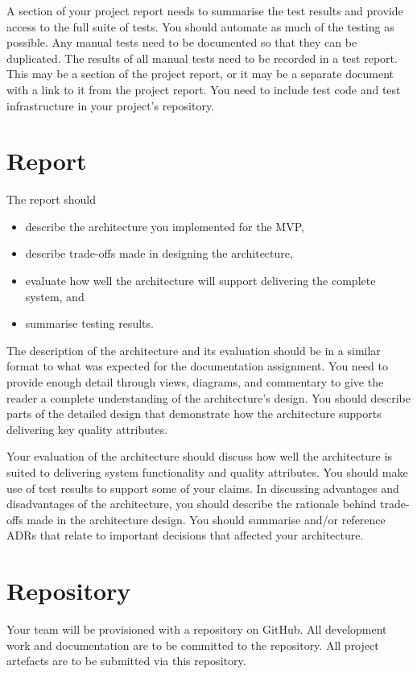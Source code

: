 \documentclass{csse4400}
\begin{document}
A section of your project report needs to summarise the test results and provide access to the full suite of tests.
You should automate as much of the testing as possible.
Any manual tests need to be documented so that they can be duplicated.
The results of all manual tests need to be recorded in a test report.
This may be a section of the project report, or it may be a separate document with a link to it from the project report.
You need to include test code and test infrastructure in your project's repository.


\section{Report}
The report should
\begin{itemize}
    \item describe the architecture you implemented for the MVP,
    \item describe trade-offs made in designing the architecture,
    \item evaluate how well the architecture will support delivering the complete system, and
    \item summarise testing results.
\end{itemize}

The description of the architecture and its evaluation should be in a similar format to what was expected for the documentation assignment.
You need to provide enough detail through views, diagrams, and commentary to give the reader a complete understanding of the architecture's design.
You should describe parts of the detailed design that demonstrate how the architecture supports delivering key quality attributes.

Your evaluation of the architecture should discuss how well the architecture is suited to delivering system functionality and quality attributes.
You should make use of test results to support some of your claims.
In discussing advantages and disadvantages of the architecture, you should describe the rationale behind trade-offs made in the architecture design.
You should summarise and/or reference ADRs that relate to important decisions that affected your architecture.


\section{Repository}
Your team will be provisioned with a repository on GitHub.
All development work and documentation are to be committed to the repository.
All project artefacts are to be submitted via this repository.
\end{document}
